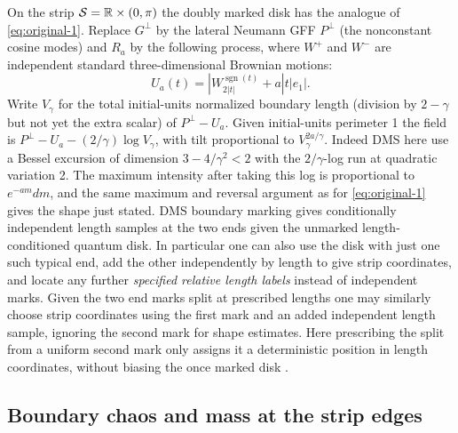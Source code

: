 On the strip \({\cal S}=\mathbb R\times(0,\pi)\) the doubly marked disk has the analogue of \eqref{eq:original-1}.
Replace \(G^\perp\) by the lateral Neumann GFF \(P^\perp\) (the nonconstant cosine modes) and \(R_a\) by the following process, where $W^+$ and $W^-$ are independent standard three-dimensional Brownian motions:
\[
 U_a(t)=|W^{\operatorname{sgn}(t)}_{2|t|}+a |t|e_1|.
\]
Write \(V_\gamma\) for the total initial-units normalized boundary length (division by \(2-\gamma\) but not yet the extra scalar) of \(P^\perp-U_a\).
Given initial-units perimeter 1 the field is \(P^\perp-U_a-(2/\gamma)\log V_\gamma\), with tilt proportional to \(V_\gamma^{2a/\gamma}\).
Indeed DMS here use a Bessel excursion of dimension \(3-4/\gamma^2<2\) with the \(2/\gamma\)-log run at quadratic variation 2.
The maximum intensity after taking this log is proportional to \(e^{-a m}dm\), and the same maximum and reversal argument as for \eqref{eq:original-1} gives the shape just stated. DMS boundary marking gives conditionally independent length samples at the two ends given the unmarked length-conditioned quantum disk.
In particular one can also use the disk with just one such typical end, add the other independently by length to give strip coordinates, and locate any further \emph{specified relative length labels} instead of independent marks.
Given the two end marks split at prescribed lengths one may similarly choose strip coordinates using the first mark and an added independent length sample, ignoring the second mark for shape estimates.
Here prescribing the split from a uniform second mark only assigns it a deterministic position in length coordinates, without biasing the once marked disk \citep{DMS,AngGwynneDisk}.

\subsection{Boundary chaos and mass at the strip edges}\label{proxy:chaos}

